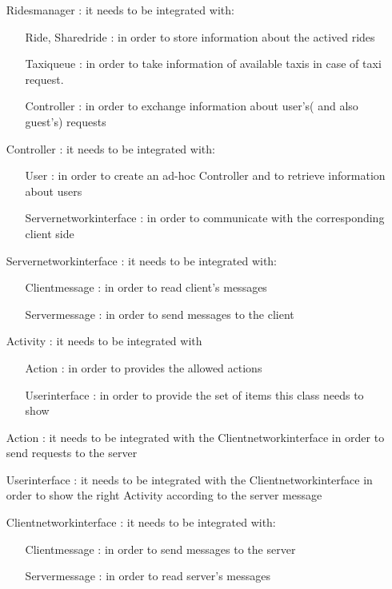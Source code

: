 \begin{itemize}
  \item[Ridesmanager]: it needs to be integrated with:
    \begin{itemize}
      \item[Ride, Sharedride]: in order to store information about the actived rides
      \item[Taxiqueue]: in order to take information of available taxis
        in case of taxi request.
      \item[Controller]: in order to exchange information about user's( and also guest's) requests
    \end{itemize}
  \item[Controller]: it needs to be integrated with:
    \begin{itemize}
      \item[User]: in order to create an ad-hoc Controller and to retrieve information about users
      \item[Servernetworkinterface]: in order to communicate with the corresponding client side
    \end{itemize}
  \item[Servernetworkinterface]: it needs to be integrated with:
    \begin{itemize}
      \item[Clientmessage]: in order to read client's messages
      \item[Servermessage]: in order to send messages to the client
    \end{itemize}
   \item[Activity]: it needs to be integrated with
     \begin{itemize}
       \item[Action]: in order to provides the allowed actions
       \item[Userinterface]: in order to provide the set of items this class needs to show
     \end{itemize}
   \item[Action]: it needs to be integrated with the Clientnetworkinterface in order to send
     requests to the server
   \item[Userinterface]: it needs to be integrated with the Clientnetworkinterface in order to
     show the right Activity according to the server message
   \item[Clientnetworkinterface]: it needs to be integrated with:
     \begin{itemize}
       \item[Clientmessage]: in order to send messages to the server 
       \item[Servermessage]: in order to read server's messages
     \end{itemize}
\end{itemize}


